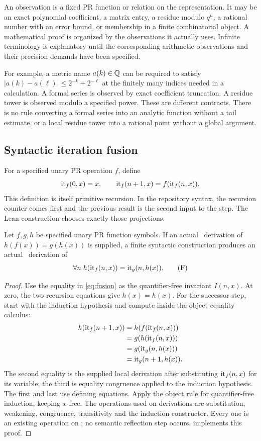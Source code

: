 An observation is a fixed PR function or relation on the representation.
It may be an exact polynomial coefficient, a matrix entry, a residue
modulo $q^n$, a rational number with an error bound, or membership in a
finite combinatorial object. A mathematical proof is organized by the
observations it actually uses. Infinite terminology is explanatory until
the corresponding arithmetic observations and their precision demands
have been specified.

For example, a metric name $a(k)\in\mathbb Q$ can be required to satisfy
$|a(k)-a(\ell)|\le2^{-k}+2^{-\ell}$ at the finitely many indices
needed in a calculation. A formal series is observed by exact coefficient
truncation. A residue tower is observed modulo a specified power. These
are different contracts. There is no rule converting a formal series
into an analytic function without a tail estimate, or a local residue
tower into a rational point without a global argument.

\subsection{Syntactic iteration fusion}

For a specified unary PR operation $f$, define
\[
 \operatorname{it}_f(0,x)=x,\qquad
 \operatorname{it}_f(n+1,x)=f(\operatorname{it}_f(n,x)).
\]
This definition is itself primitive recursion. In the repository syntax,
the recursion counter comes first and the previous result is the second
input to the step. The Lean construction chooses exactly those projections.

\begin{theorem}\label{thm:fusion}
Let $f,g,h$ be specified unary PR function symbols. If an actual
\ipra\ derivation of $h(f(x))=g(h(x))$ is supplied, a finite
syntactic construction produces an actual \ipra\ derivation of
\[
 \forall n\;h(\operatorname{it}_f(n,x))=\operatorname{it}_g(n,h(x)).
 \tag{F}\label{eq:fusion}
\]
\end{theorem}

\begin{proof}
Use the equality in \eqref{eq:fusion} as the quantifier-free invariant
$I(n,x)$. At zero, the two recursion equations give $h(x)=h(x)$.
For the successor step, start with the induction hypothesis and compute
inside the object equality calculus:
\begin{align*}
 h(\operatorname{it}_f(n+1,x))
 &=h(f(\operatorname{it}_f(n,x)))\\
 &=g(h(\operatorname{it}_f(n,x)))\\
 &=g(\operatorname{it}_g(n,h(x)))\\
 &=\operatorname{it}_g(n+1,h(x)).
\end{align*}
The second equality is the supplied local derivation after substituting
$\operatorname{it}_f(n,x)$ for its variable; the third is equality congruence
applied to the induction hypothesis. The first and last use defining
equations. Apply the object rule for quantifier-free induction, keeping
$x$ free. The operations used on derivations are substitution,
weakening, congruence, transitivity and the induction constructor.
Every one is an existing operation on ; no semantic reflection
step occurs.  implements this proof.
\end{proof}

